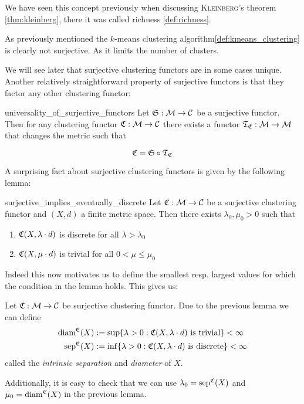 We have seen this concept previously when discussing \textsc{Kleinberg}'s theorem \ref{thm:kleinberg}, there it was called richness \ref{def:richness}.

As previously mentioned the $k$-means clustering algorithm\ref{def:kmeans_clustering} is clearly not surjective. As it limits the number of clusters.

We will see later that surjective clustering functors are in some cases unique. Another relatively straightforward property of surjective functors is that they factor any other clustering functor:

\begin{proposition}{}{universality_of_surjective_functors}
Let $\mathfrak{S}: \mathcal{M} \to \mathcal{C}$ be a surjective functor. Then for any clustering functor $\mathfrak{C}: \mathcal{M} \to \mathcal{C}$ there exists a functor $\mathfrak{T}_{\mathfrak{C}}: \mathcal{M} \to \mathcal{M}$ that changes the metric such that

\begin{equation*}
\mathfrak{C} = \mathfrak{S} \circ \mathfrak{T}_{\mathfrak{C}}
\end{equation*}
\end{proposition}

A surprising fact about surjective clustering functors is given by the following lemma:

\begin{lemma}{}{surjective_implies_eventually_discrete}
Let $\mathfrak{C}: \mathcal{M} \to \mathcal{C}$ be a surjective clustering functor and $(X,d)$ a finite metric space. Then there exists $\lambda_0, \mu_0 > 0$ such that
\begin{enumerate}
    \item $\mathfrak{C}(X,\lambda \cdot d)$ is discrete for all $\lambda > \lambda_0$
    \item $\mathfrak{C}(X,\mu \cdot d)$ is trivial for all $0 < \mu \le \mu_0$
\end{enumerate}
\end{lemma}

Indeed this now motivates us to define the smallest resp. largest values for which the condition in the lemma holds. This gives us:

\begin{definition}{}{}
Let $\mathfrak{C}: \mathcal{M} \to \mathcal{C}$ be surjective clustering functor. Due to the previous lemma we can define
\begin{align*}
\mathrm{diam}^{\mathfrak{C}}(X) &:= \sup\{ \lambda > 0: \mathfrak{C}(X,\lambda \cdot d) \text{ is trivial}\} < \infty\\
\mathrm{sep}^{\mathfrak{C}}(X) &:= \inf\{ \lambda > 0: \mathfrak{C}(X,\lambda \cdot d) \text{ is discrete}\} < \infty
\end{align*}
called the \emph{intrinsic separation} and \emph{diameter} of $X$. 
\end{definition}
Additionally, it is easy to check that we can use $\lambda_0 = \mathrm{sep}^{\mathfrak{C}}(X)$ and $\mu_0 = \mathrm{diam}^{\mathfrak{C}}(X)$ in the previous lemma.

